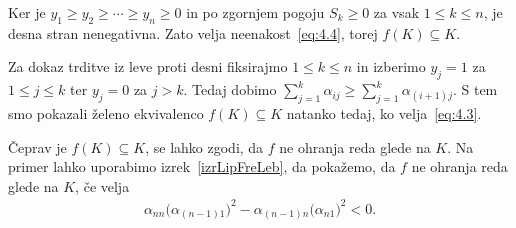 \documentclass[mat2, tisk]{fmfdelo}
\begin{document}
\begin{zgled}
  Ker je $y_1\geq y_2\geq\cdots\geq y_n\geq0$ in po zgornjem pogoju
  $S_k\geq0$ za vsak $1\leq k\leq n$, je desna stran nenegativna.
  Zato velja neenakost~\eqref{eq:4.4}, torej $f(K)\subseteq K$.

  Za dokaz trditve iz leve proti desni fiksirajmo $1\leq k\leq n$ in izberimo
  $y_j=1$ za $1\leq j\leq k$ ter $y_j=0$ za $j>k$. Tedaj dobimo
  $\sum\limits_{j=1}^k\alpha_{ij}
  \geq\sum\limits_{j=1}^k\alpha_{(i+1)j}$.
  S tem smo pokazali želeno ekvivalenco $f(K)\subseteq K$ natanko tedaj,
  ko velja~\eqref{eq:4.3}.
\end{zgled}

Čeprav je $f(K)\subseteq K$, se lahko zgodi, da $f$ ne ohranja reda
glede na $K$. Na primer lahko uporabimo izrek~\ref{izrLipFreLeb}, da pokažemo, da $f$ ne ohranja reda glede na
$K$, če velja
\begin{align*}
\alpha_{nn}\bigl(\alpha_{(n-1)1}\bigr)^2
-
\alpha_{(n-1)n}\bigl(\alpha_{n1}\bigr)^2
<0.
\end{align*}
\end{document}
